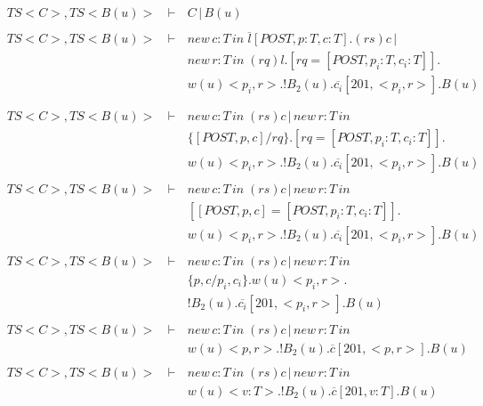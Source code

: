 \setcounter{equation}{0}
\begin{eqnarray*}
 \ TS<C>,TS<B(u)>\, &\vdash\,&  C\,|\,B(u) \\
 \               &        &          \\
 \ TS<C>,TS<B(u)>\, &\vdash\,& new\,c:T\,in\;\overline{l}[POST,p:T,c:T].(rs)c\,|\\
 \               &\,      & new\,r:T\,in\;(rq)l.[rq = [POST,p_i:T,c_i:T]].\\
 \               &        & w(u)<p_i,r>.!B_2(u).\overline{c_i}[201,<p_i,r>].B(u) \\
 \               &        &          \\
\end{eqnarray*}
\begin{eqnarray*}
 \ TS<C>,TS<B(u)>\, &\vdash\,& new\,c:T\,in\;(rs)c\,|\,new\,r:T\,in\;\\
 \               &\,      & \{[POST,p,c]/rq\}.[rq = [POST,p_i:T,c_i:T]].\\
 \               &        & w(u)<p_i,r>.!B_2(u).\overline{c_i}[201,<p_i,r>].B(u) \\
 \               &        &          \\
 \ TS<C>,TS<B(u)>\, &\vdash\,& new\,c:T\,in\;(rs)c\,|\,new\,r:T\,in\;\\
 \               &\,      & [[POST,p,c] = [POST,p_i:T,c_i:T]].\\
 \               &        & w(u)<p_i,r>.!B_2(u).\overline{c_i}[201,<p_i,r>].B(u) \\
 \               &        &          \\
 \ TS<C>,TS<B(u)>\, &\vdash\,& new\,c:T\,in\;(rs)c\,|\,new\,r:T\,in\;\\
 \               &\,      & \{p,c/p_i,c_i\}.w(u)<p_i,r>.\\
 \               &        & !B_2(u).\overline{c_i}[201,<p_i,r>].B(u) \\
 \               &        &          \\
 \ TS<C>,TS<B(u)>\, &\vdash\,& new\,c:T\,in\;(rs)c\,|\,new\,r:T\,in\;\\
 \               &\,      & w(u)<p,r>.!B_2(u).\overline{c}[201,<p,r>].B(u) \\
 \               &        & \\
 \ TS<C>,TS<B(u)>\, &\vdash\,& new\,c:T\,in\;(rs)c\,|\,new\,r:T\,in\;\\
 \               &\,      & w(u)<v:T>.!B_2(u).\overline{c}[201,v:T].B(u) \\
 \               &        & \\
\end{eqnarray*}

